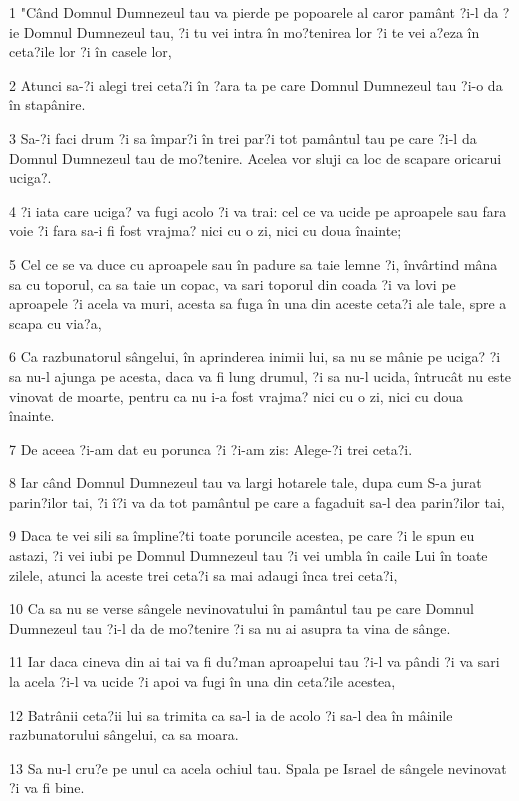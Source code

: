 \par 1 "Când Domnul Dumnezeul tau va pierde pe popoarele al caror pamânt ?i-l da ?ie Domnul Dumnezeul tau, ?i tu vei intra în mo?tenirea lor ?i te vei a?eza în ceta?ile lor ?i în casele lor,
\par 2 Atunci sa-?i alegi trei ceta?i în ?ara ta pe care Domnul Dumnezeul tau ?i-o da în stapânire.
\par 3 Sa-?i faci drum ?i sa împar?i în trei par?i tot pamântul tau pe care ?i-l da Domnul Dumnezeul tau de mo?tenire. Acelea vor sluji ca loc de scapare oricarui uciga?.
\par 4 ?i iata care uciga? va fugi acolo ?i va trai: cel ce va ucide pe aproapele sau fara voie ?i fara sa-i fi fost vrajma? nici cu o zi, nici cu doua înainte;
\par 5 Cel ce se va duce cu aproapele sau în padure sa taie lemne ?i, învârtind mâna sa cu toporul, ca sa taie un copac, va sari toporul din coada ?i va lovi pe aproapele ?i acela va muri, acesta sa fuga în una din aceste ceta?i ale tale, spre a scapa cu via?a,
\par 6 Ca razbunatorul sângelui, în aprinderea inimii lui, sa nu se mânie pe uciga? ?i sa nu-l ajunga pe acesta, daca va fi lung drumul, ?i sa nu-l ucida, întrucât nu este vinovat de moarte, pentru ca nu i-a fost vrajma? nici cu o zi, nici cu doua înainte.
\par 7 De aceea ?i-am dat eu porunca ?i ?i-am zis: Alege-?i trei ceta?i.
\par 8 Iar când Domnul Dumnezeul tau va largi hotarele tale, dupa cum S-a jurat parin?ilor tai, ?i î?i va da tot pamântul pe care a fagaduit sa-l dea parin?ilor tai,
\par 9 Daca te vei sili sa împline?ti toate poruncile acestea, pe care ?i le spun eu astazi, ?i vei iubi pe Domnul Dumnezeul tau ?i vei umbla în caile Lui în toate zilele, atunci la aceste trei ceta?i sa mai adaugi înca trei ceta?i,
\par 10 Ca sa nu se verse sângele nevinovatului în pamântul tau pe care Domnul Dumnezeul tau ?i-l da de mo?tenire ?i sa nu ai asupra ta vina de sânge.
\par 11 Iar daca cineva din ai tai va fi du?man aproapelui tau ?i-l va pândi ?i va sari la acela ?i-l va ucide ?i apoi va fugi în una din ceta?ile acestea,
\par 12 Batrânii ceta?ii lui sa trimita ca sa-l ia de acolo ?i sa-l dea în mâinile razbunatorului sângelui, ca sa moara.
\par 13 Sa nu-l cru?e pe unul ca acela ochiul tau. Spala pe Israel de sângele nevinovat ?i va fi bine.

